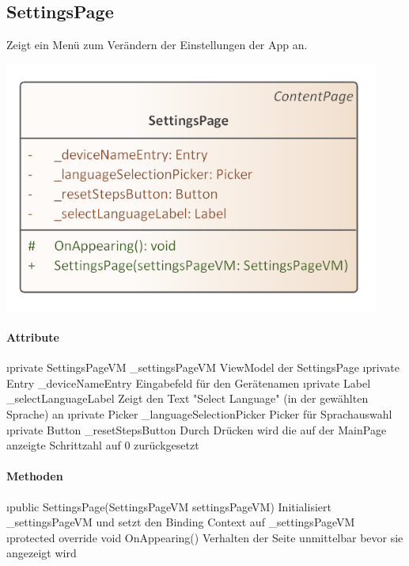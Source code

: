 \documentclass[../entwurf.tex]{subfiles}
\begin{document}
\subsection{SettingsPage}
Zeigt ein Menü zum Verändern der Einstellungen der App an.
\begin{center}
	\includegraphics[page=1,width=350pt,keepaspectratio]{../uml_klassen/View/SettingsPage.png}
\end{center}
\paragraph{Attribute}

\begin{itemize}
	\i{private SettingsPageVM \_settingsPageVM} ViewModel der SettingsPage
	\i{private Entry \_deviceNameEntry} Eingabefeld für den Gerätenamen
	\i{private Label \_selectLanguageLabel} Zeigt den Text "Select Language" (in der gewählten Sprache) an
	\i{private Picker \_languageSelectionPicker} Picker für Sprachauswahl
	\i{private Button \_resetStepsButton} Durch Drücken wird die auf der MainPage anzeigte Schrittzahl auf 0 zurückgesetzt
\end{itemize}

\paragraph{Methoden}

\begin{itemize}
	\i{public SettingsPage(SettingsPageVM settingsPageVM)} Initialisiert \_settingsPageVM und setzt den Binding Context 			auf \_settingsPageVM
	\i{protected override void OnAppearing()} Verhalten der Seite unmittelbar bevor sie angezeigt wird
\end{itemize}
\end{document}
